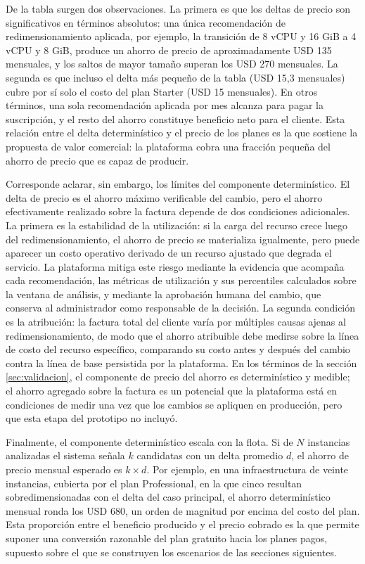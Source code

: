 De la tabla surgen dos observaciones. La primera es que los deltas de precio son significativos en términos absolutos: una única recomendación de redimensionamiento aplicada, por ejemplo, la transición de 8 vCPU y 16 GiB a 4 vCPU y 8 GiB, produce un ahorro de precio de aproximadamente USD 135 mensuales, y los saltos de mayor tamaño superan los USD 270 mensuales. La segunda es que incluso el delta más pequeño de la tabla (USD 15,3 mensuales) cubre por sí solo el costo del plan Starter (USD 15 mensuales). En otros términos, una sola recomendación aplicada por mes alcanza para pagar la suscripción, y el resto del ahorro constituye beneficio neto para el cliente. Esta relación entre el delta determinístico y el precio de los planes es la que sostiene la propuesta de valor comercial: la plataforma cobra una fracción pequeña del ahorro de precio que es capaz de producir.

Corresponde aclarar, sin embargo, los límites del componente determinístico. El delta de precio es el ahorro máximo verificable del cambio, pero el ahorro efectivamente realizado sobre la factura depende de dos condiciones adicionales. La primera es la estabilidad de la utilización: si la carga del recurso crece luego del redimensionamiento, el ahorro de precio se materializa igualmente, pero puede aparecer un costo operativo derivado de un recurso ajustado que degrada el servicio. La plataforma mitiga este riesgo mediante la evidencia que acompaña cada recomendación, las métricas de utilización y sus percentiles calculados sobre la ventana de análisis, y mediante la aprobación humana del cambio, que conserva al administrador como responsable de la decisión. La segunda condición es la atribución: la factura total del cliente varía por múltiples causas ajenas al redimensionamiento, de modo que el ahorro atribuible debe medirse sobre la línea de costo del recurso específico, comparando su costo antes y después del cambio contra la línea de base persistida por la plataforma. En los términos de la sección \ref{sec:validacion}, el componente de precio del ahorro es determinístico y medible; el ahorro agregado sobre la factura es un potencial que la plataforma está en condiciones de medir una vez que los cambios se apliquen en producción, pero que esta etapa del prototipo no incluyó.

Finalmente, el componente determinístico escala con la flota. Si de $N$ instancias analizadas el sistema señala $k$ candidatas con un delta promedio $d$, el ahorro de precio mensual esperado es $k \times d$. Por ejemplo, en una infraestructura de veinte instancias, cubierta por el plan Professional, en la que cinco resultan sobredimensionadas con el delta del caso principal, el ahorro determinístico mensual ronda los USD 680, un orden de magnitud por encima del costo del plan. Esta proporción entre el beneficio producido y el precio cobrado es la que permite suponer una conversión razonable del plan gratuito hacia los planes pagos, supuesto sobre el que se construyen los escenarios de las secciones siguientes.

